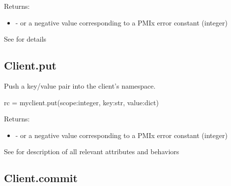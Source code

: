 \begin{arglist}
\end{arglist}

Returns:

\begin{itemize}
    \item {} -  or a negative value corresponding to a PMIx error constant (integer)
\end{itemize}


See  for details


\subsection{Client.put}

\summary

Push a key/value pair into the client's namespace.

\format

\pyspecificstart
\begin{codepar}
rc = myclient.put(scope:integer, key:str, value:dict)
\end{codepar}
\pyspecificend

\begin{arglist}
\end{arglist}

Returns:

\begin{itemize}
    \item {} -  or a negative value corresponding to a PMIx error constant (integer)
\end{itemize}


See  for description of all relevant attributes and behaviors


\subsection{Client.commit}

